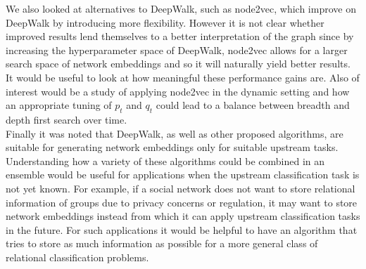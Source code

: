 \documentclass[a4paper]{article}
\begin{document}
We also looked at alternatives to DeepWalk, such as node2vec, which improve on DeepWalk by introducing more flexibility. However it is not clear whether improved results lend themselves to a better interpretation of the graph since by increasing the hyperparameter space of DeepWalk, node2vec allows for a larger search space of network embeddings and so it will naturally yield better results.
It would be useful to look at how meaningful these performance gains are. Also of interest would be a study of applying node2vec in the dynamic setting and how an appropriate tuning of $p_t$ and $q_t$ could lead to a balance between breadth and depth first search over time.\\
Finally it was noted that DeepWalk, as well as other proposed algorithms, are suitable for generating network embeddings only for suitable upstream tasks. Understanding how a variety of these algorithms could be combined in an ensemble would be useful for applications when the upstream classification task is not yet known. For example, if a social network
does not want to store relational information of groups due to privacy concerns or regulation, it may want to store network embeddings instead from which it can apply upstream classification tasks in the future. For such applications it would be helpful to have an algorithm that tries to store as much information as possible for a more general class of relational classification problems.\\






\printindex
\end{document}
